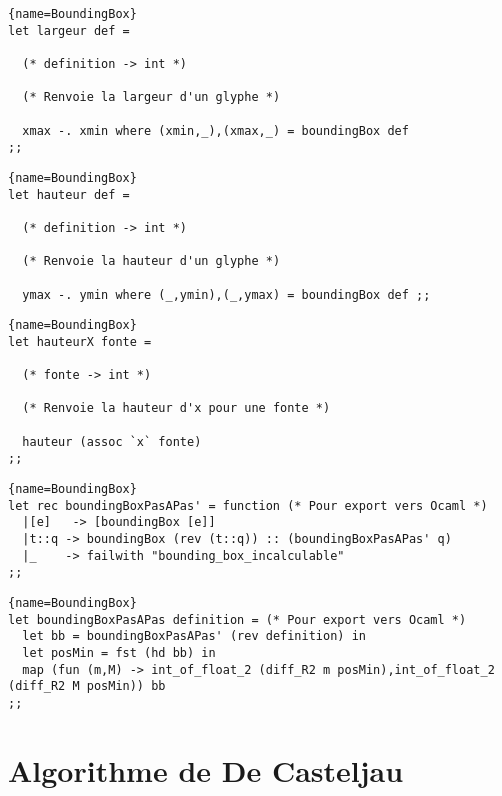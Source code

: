 \documentclass[10pt,twoside,a4paper]{article}
\begin{document}
\begin{lstlisting}{name=BoundingBox}
let largeur def =

  (* definition -> int *)

  (* Renvoie la largeur d'un glyphe *)

  xmax -. xmin where (xmin,_),(xmax,_) = boundingBox def
;;
\end{lstlisting}

\begin{lstlisting}{name=BoundingBox}  
let hauteur def =

  (* definition -> int *)

  (* Renvoie la hauteur d'un glyphe *)

  ymax -. ymin where (_,ymin),(_,ymax) = boundingBox def ;;
\end{lstlisting}

\begin{lstlisting}{name=BoundingBox}
let hauteurX fonte =

  (* fonte -> int *)

  (* Renvoie la hauteur d'x pour une fonte *)
  
  hauteur (assoc `x` fonte)
;;
\end{lstlisting}

\begin{lstlisting}{name=BoundingBox}
let rec boundingBoxPasAPas' = function (* Pour export vers Ocaml *)
  |[e]   -> [boundingBox [e]]
  |t::q -> boundingBox (rev (t::q)) :: (boundingBoxPasAPas' q)
  |_    -> failwith "bounding_box_incalculable"
;;
\end{lstlisting}

\begin{lstlisting}{name=BoundingBox}
let boundingBoxPasAPas definition = (* Pour export vers Ocaml *)
  let bb = boundingBoxPasAPas' (rev definition) in
  let posMin = fst (hd bb) in
  map (fun (m,M) -> int_of_float_2 (diff_R2 m posMin),int_of_float_2 (diff_R2 M posMin)) bb
;;
\end{lstlisting}
\pagebreak
\section{Algorithme de De Casteljau}%
\end{document}

